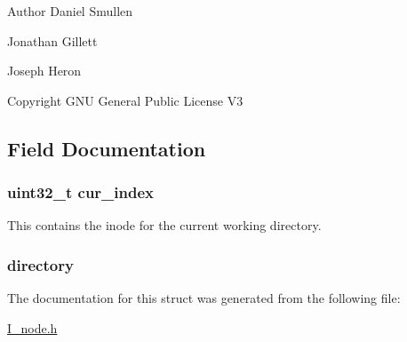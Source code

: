 \begin{DoxyAuthor}{Author}
Daniel Smullen

Jonathan Gillett

Joseph Heron
\end{DoxyAuthor}
\begin{DoxyCopyright}{Copyright}
G\-N\-U General Public License V3 
\end{DoxyCopyright}


\subsection{Field Documentation}
\hypertarget{structcwd_af9f19a44a251a4b45c3e949b698b9294}{
\subsubsection[{cur\-\_\-index}]{\setlength{\rightskip}{0pt plus 5cm}uint32\-\_\-t cur\-\_\-index}}\label{structcwd_af9f19a44a251a4b45c3e949b698b9294}
This contains the inode for the current working directory. \hypertarget{structcwd_a09a79f07c0f19843fbe3e5277106c8db}{
\subsubsection[{directory}]{ directory}}\label{structcwd_a09a79f07c0f19843fbe3e5277106c8db}


The documentation for this struct was generated from the following file\-:\begin{DoxyCompactItemize}
\item 
\hyperlink{_i__node_8h}{I\-\_\-node.\-h}\end{DoxyCompactItemize}
